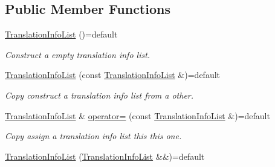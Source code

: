 \subsection*{Public Member Functions}
\begin{DoxyCompactItemize}
\item 
\hyperlink{class_mdt_1_1_translation_1_1_translation_info_list_a9c4c8ef53174fdb661bf673992364392}{Translation\+Info\+List} ()=default\hypertarget{class_mdt_1_1_translation_1_1_translation_info_list_a9c4c8ef53174fdb661bf673992364392}{}\label{class_mdt_1_1_translation_1_1_translation_info_list_a9c4c8ef53174fdb661bf673992364392}

\begin{DoxyCompactList}\small\item\em Construct a empty translation info list. \end{DoxyCompactList}\item 
\hyperlink{class_mdt_1_1_translation_1_1_translation_info_list_af512726197924f866c569c61abe70cc2}{Translation\+Info\+List} (const \hyperlink{class_mdt_1_1_translation_1_1_translation_info_list}{Translation\+Info\+List} \&)=default\hypertarget{class_mdt_1_1_translation_1_1_translation_info_list_af512726197924f866c569c61abe70cc2}{}\label{class_mdt_1_1_translation_1_1_translation_info_list_af512726197924f866c569c61abe70cc2}

\begin{DoxyCompactList}\small\item\em Copy construct a translation info list from a other. \end{DoxyCompactList}\item 
\hyperlink{class_mdt_1_1_translation_1_1_translation_info_list}{Translation\+Info\+List} \& \hyperlink{class_mdt_1_1_translation_1_1_translation_info_list_aec41077e9864b58353e61bb4a16bb925}{operator=} (const \hyperlink{class_mdt_1_1_translation_1_1_translation_info_list}{Translation\+Info\+List} \&)=default\hypertarget{class_mdt_1_1_translation_1_1_translation_info_list_aec41077e9864b58353e61bb4a16bb925}{}\label{class_mdt_1_1_translation_1_1_translation_info_list_aec41077e9864b58353e61bb4a16bb925}

\begin{DoxyCompactList}\small\item\em Copy assign a translation info list this this one. \end{DoxyCompactList}\item 
\hyperlink{class_mdt_1_1_translation_1_1_translation_info_list_a8b93d14d9f90c54dd5b4669788dd3eed}{Translation\+Info\+List} (\hyperlink{class_mdt_1_1_translation_1_1_translation_info_list}{Translation\+Info\+List} \&\&)=default\hypertarget{class_mdt_1_1_translation_1_1_translation_info_list_a8b93d14d9f90c54dd5b4669788dd3eed}{}\label{class_mdt_1_1_translation_1_1_translation_info_list_a8b93d14d9f90c54dd5b4669788dd3eed}


\end{DoxyCompactItemize}
